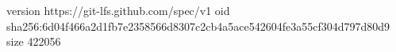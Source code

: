 version https://git-lfs.github.com/spec/v1
oid sha256:6d04f466a2d1fb7e2358566d8307c2cb4a5ace542604fe3a55cf304d797d80d9
size 422056
